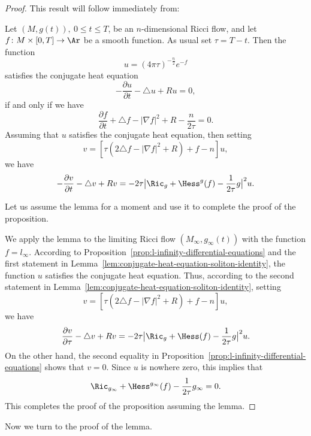\begin{proof}  This result will follow immediately
from:


\begin{lemma}\label{lem:conjugate-heat-equation-soliton-identity}
\label{9.1}
Let $(M,g(t)),\ 0\le t\le T$, be an $n$-dimensional Ricci flow, and
let $f\colon M\times [0,T]\to \Ar$ be a smooth function. As usual
set $\tau=T-t$. Then the function
$$u=(4\pi\tau)^{-\frac{n}{2}}e^{-f}$$ satisfies the conjugate heat
equation
$$-\frac{\partial u}{\partial t}-\triangle u+Ru=0,$$ if and only if we have
$$\frac{\partial f}{\partial t}+\triangle f-|\nabla
f|^2+R-\frac{n}{2\tau}=0.$$ Assuming that $u$ satisfies the
conjugate heat equation, then setting
$$v=\left[\tau\left(2\triangle f-|\nabla
f|^2+R\right)+f-n\right]u,$$ we have
$$-\frac{\partial v}{\partial t}-\triangle v+Rv=-2\tau
\bigl|\Ric_g+\Hess^g(f)-\frac{1}{2\tau}g\bigr|^2u.$$
\end{lemma}

Let us assume the lemma for a moment and use it to complete the
proof of the proposition.

We apply the lemma to the limiting Ricci flow
$(M_\infty,g_\infty(t))$ with the function $f=l_\infty$. According
to Proposition~\ref{prop:l-infinity-differential-equations} and the first statement in
Lemma~\ref{lem:conjugate-heat-equation-soliton-identity}, the function $u$ satisfies the conjugate heat
equation. Thus, according to the second statement in
Lemma~\ref{lem:conjugate-heat-equation-soliton-identity}, setting
$$v=\left[\tau\left(2\triangle f-|\nabla
f|^2+R\right)+f-n\right]u,$$ we have
$$\frac{\partial v}{\partial\tau}-\triangle v+Rv=-2\tau
\bigl|\Ric_g+\Hess(f)-\frac{1}{2\tau}g\bigr|^2u.$$ On the
other hand, the second equality in Proposition~\ref{prop:l-infinity-differential-equations} shows
that $v=0$. Since $u$ is nowhere zero, this implies that
$$\Ric_{g_\infty}+\Hess^{g_\infty}(f)-\frac{1}{2\tau}g_\infty=0.$$
This completes the proof of the proposition assuming the lemma.
\end{proof}

Now we turn to the proof of the lemma.

